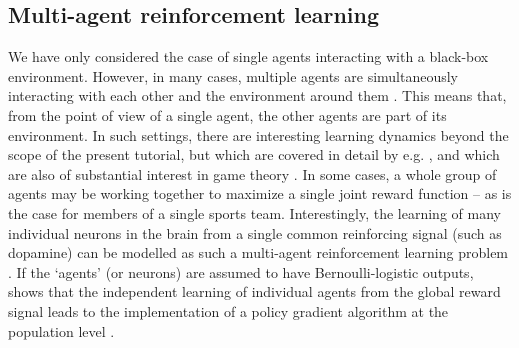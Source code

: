 

\subsection{Multi-agent reinforcement learning}
\label{sec:multi-agent}
We have only considered the case of single agents interacting with a black-box environment.
However, in many cases, multiple agents are simultaneously interacting with each other and the environment around them \citep{gronauer2022multi}.
This means that, from the point of view of a single agent, the other agents are part of its environment.
In such settings, there are interesting learning dynamics beyond the scope of the present tutorial, but which are covered in detail by e.g. \citet{gronauer2022multi}, and which are also of substantial interest in game theory \citep{nowe2012game}.
In some cases, a whole group of agents may be working together to maximize a single joint reward function -- as is the case for members of a single sports team.
Interestingly, the learning of many individual neurons in the brain from a single common reinforcing signal (such as dopamine) can be modelled as such a multi-agent reinforcement learning problem \citep{sutton2018reinforcement}.
If the `agents' (or neurons) are assumed to have Bernoulli-logistic outputs, \citet{williams1992simple} shows that the independent learning of individual agents from the global reward signal leads to the implementation of a policy gradient algorithm at the population level \citep{sutton2018reinforcement}.
